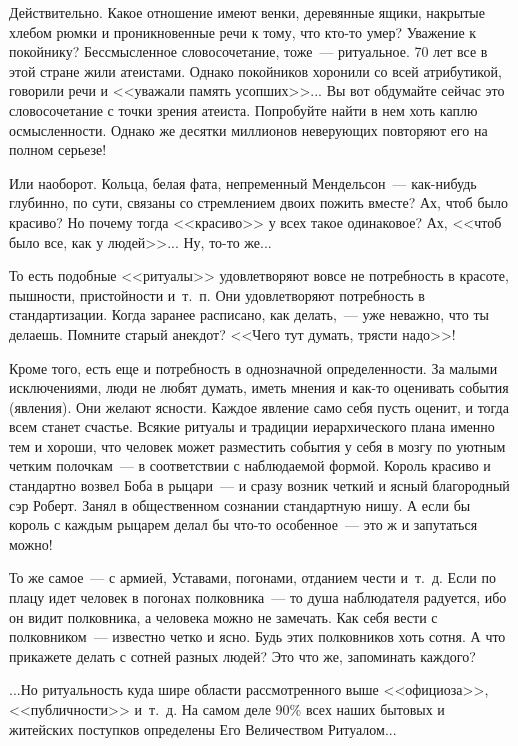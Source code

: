 \documentclass{scrbook}
\newcommand{\flqq}{<<}
\newcommand{\frqq}{>>}
\newcommand{\mdash}{~--- }
\newcommand{\commamdash}{~--- } %
\begin{document}
Действительно. Какое отношение имеют венки, деревянные ящики, накрытые хлебом рюмки и проникновенные речи к тому, что кто-то умер? Уважение к покойнику? Бессмысленное словосочетание, тоже{\mdash}ритуальное. 70 лет все в этой стране жили атеистами. Однако покойников хоронили со всей атрибутикой, говорили речи и {\flqq}уважали память усопших{\frqq}... Вы вот обдумайте сейчас это словосочетание с точки зрения атеиста. Попробуйте найти в нем хоть каплю осмысленности. Однако же десятки миллионов неверующих повторяют его на полном серьезе!

Или наоборот. Кольца, белая фата, непременный Мендельсон{\mdash}как-нибудь глубинно, по сути, связаны со стремлением двоих пожить вместе? Ах, чтоб было красиво? Но почему тогда {\flqq}красиво{\frqq} у всех такое одинаковое? Ах, {\flqq}чтоб было все, как у людей{\frqq}... Ну, то-то же...

То есть подобные {\flqq}ритуалы{\frqq} удовлетворяют вовсе не потребность в красоте, пышности, пристойности и~т.~п. Они удовлетворяют потребность в стандартизации. Когда заранее расписано, как делать,{\commamdash}уже неважно, что ты делаешь. Помните старый анекдот? {\flqq}Чего тут думать, трясти надо{\frqq}!

Кроме того, есть еще и потребность в однозначной определенности. За малыми исключениями, люди не любят думать, иметь мнения и как-то оценивать события (явления). Они желают ясности. Каждое явление само себя пусть оценит, и тогда всем станет счастье. Всякие ритуалы и традиции иерархического плана именно тем и хороши, что человек может разместить события у себя в мозгу по уютным четким полочкам{\mdash}в соответствии с наблюдаемой формой. Король красиво и стандартно возвел Боба в рыцари{\mdash}и сразу возник четкий и ясный благородный сэр Роберт. Занял в общественном сознании стандартную нишу. А если бы король с каждым рыцарем делал бы что-то особенное{\mdash}это ж и запутаться можно!

То же самое{\mdash}с армией, Уставами, погонами, отданием чести и~т.~д. Если по плацу идет человек в погонах полковника{\mdash}то душа наблюдателя радуется, ибо он видит полковника, а человека можно не замечать. Как себя вести с полковником{\mdash}известно четко и ясно. Будь этих полковников хоть сотня. А что прикажете делать с сотней разных людей? Это что же, запоминать каждого?

...Но ритуальность куда шире области рассмотренного выше {\flqq}официоза{\frqq}, {\flqq}публичности{\frqq} и~т.~д. На самом деле 90\% всех наших бытовых и житейских поступков определены Его Величеством Ритуалом...
\end{document}
